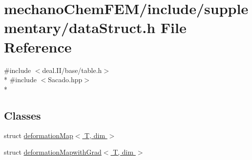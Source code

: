 \section{mechano\-Chem\-F\-E\-M/include/supplementary/data\-Struct.h File Reference}
\label{data_struct_8h}
{\ttfamily \#include $<$deal.\-I\-I/base/table.\-h$>$}\\*
{\ttfamily \#include $<$Sacado.\-hpp$>$}\\*
\subsection*{Classes}
\begin{DoxyCompactItemize}
\item 
struct \hyperlink{structdeformation_map}{deformation\-Map$<$ T, dim $>$}
\item 
struct \hyperlink{structdeformation_mapwith_grad}{deformation\-Mapwith\-Grad$<$ T, dim $>$}
\end{DoxyCompactItemize}
